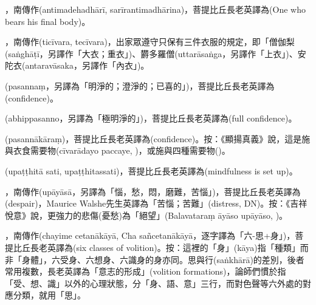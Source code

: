 \startitemgroup[noteitems]
\item{}，南傳作(antimadehadhārī, sarīrantimadhārina)，菩提比丘長老英譯為(One who bears his final body)。
\stopitemgroup

\startitemgroup[noteitems]
\item{}，南傳作(ticīvara, tecīvara)，出家眾遵守只保有三件衣服的規定，即「僧伽梨(saṅghāṭī，另譯作「大衣；重衣」)、欝多羅僧(uttarāsaṅga，另譯作「上衣」)、安陀衣(antaravāsaka，另譯作「內衣」)。
\stopitemgroup

\startitemgroup[noteitems]
\item{}(pasannaṃ，另譯為「明淨的；澄淨的；已喜的」)，菩提比丘長老英譯為(confidence)。
\item{}(abhippasanno，另譯為「極明淨的」)，菩提比丘長老英譯為(full confidence)。
\item{}(pasannākāraṃ)，菩提比丘長老英譯為(confidence)。按：《顯揚真義》說，這是施與衣食需要物(cīvarādayo paccaye, )，或施與四種需要物()。
\stopitemgroup

\startitemgroup[noteitems]
\item{}(upaṭṭhitā sati, upaṭṭhitassati)，菩提比丘長老英譯為(mindfulness is set up)。
\stopitemgroup

\startitemgroup[noteitems]
\item{}，南傳作(upāyāsā，另譯為「惱，愁，悶，磨難，苦惱」)，菩提比丘長老英譯為(despair)，Maurice Walshe先生英譯為「苦惱；苦難」(distress, DN)。按：《吉祥悅意》說，更強力的悲傷(憂愁)為「絕望」(Balavataraṃ āyāso upāyāso, )。
\stopitemgroup

\startitemgroup[noteitems]
\item{}，南傳作(chayime cetanākāyā, Cha sañcetanākāyā，逐字譯為「六-思+身」)，菩提比丘長老英譯為(six classes of volition)。按：這裡的「身」(kāya)指「種類」而非「身體」，六受身、六想身、六識身的身亦同。思與行(saṅkhārā)的差別，後者常用複數，長老英譯為「意志的形成」(volition formations)，論師們慣於指「受、想、識」以外的心理狀態，分「身、語、意」三行，而對色聲等六外處的對應分類，就用「思」。
\stopitemgroup

